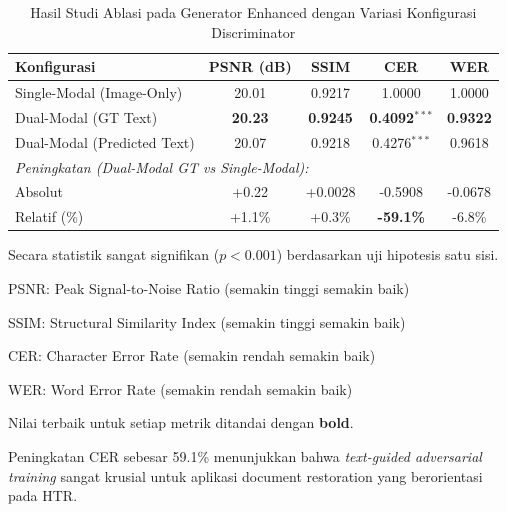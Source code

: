 
\begin{table}[htbp]
\centering
\caption{Hasil Studi Ablasi pada Generator Enhanced dengan Variasi Konfigurasi Discriminator}
\label{tab:ablation_results}
\begin{tabular}{lcccc}
\toprule
\textbf{Konfigurasi} & \textbf{PSNR (dB)} & \textbf{SSIM} & \textbf{CER} & \textbf{WER} \\
\midrule
Single-Modal (Image-Only) & 20.01 & 0.9217 & 1.0000 & 1.0000 \\
Dual-Modal (GT Text) & \textbf{20.23} & \textbf{0.9245} & \textbf{0.4092}$^{***}$ & \textbf{0.9322} \\
Dual-Modal (Predicted Text) & 20.07 & 0.9218 & 0.4276$^{***}$ & 0.9618 \\
\midrule
\multicolumn{5}{l}{\textit{Peningkatan (Dual-Modal GT vs Single-Modal):}} \\
\quad Absolut & +0.22 & +0.0028 & -0.5908 & -0.0678 \\
\quad Relatif (\%) & +1.1\% & +0.3\% & \textbf{-59.1\%} & -6.8\% \\
\bottomrule
\end{tabular}

\begin{tablenotes}
\small
\item[$^{***}$] Secara statistik sangat signifikan ($p < 0.001$) berdasarkan uji hipotesis satu sisi.
\item PSNR: Peak Signal-to-Noise Ratio (semakin tinggi semakin baik)
\item SSIM: Structural Similarity Index (semakin tinggi semakin baik)
\item CER: Character Error Rate (semakin rendah semakin baik)
\item WER: Word Error Rate (semakin rendah semakin baik)
\item Nilai terbaik untuk setiap metrik ditandai dengan \textbf{bold}.
\item Peningkatan CER sebesar 59.1\% menunjukkan bahwa \textit{text-guided adversarial training} sangat krusial untuk aplikasi document restoration yang berorientasi pada HTR.
\end{tablenotes}
\end{table}

